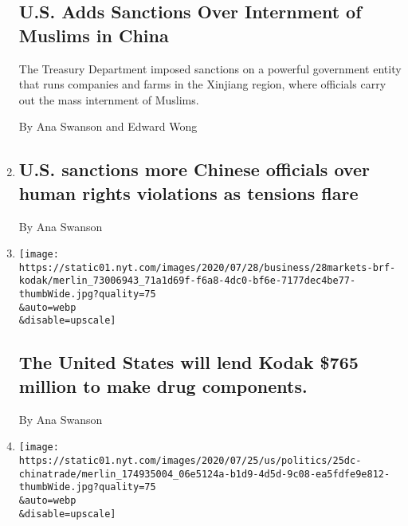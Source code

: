 \begin{enumerate}
{  \subsection{U.S. Adds Sanctions Over Internment of Muslims in
  China}\label{us-adds-sanctions-over-internment-of-muslims-in-china}}

  The Treasury Department imposed sanctions on a powerful government
  entity that runs companies and farms in the Xinjiang region, where
  officials carry out the mass internment of Muslims.

  By Ana Swanson and Edward Wong
\item
  \href{/live/2020/07/31/business/stock-market-today-coronavirus/us-sanctions-more-chinese-officials-over-human-rights-violations-as-tensions-flare}{}

  \hypertarget{us-sanctions-more-chinese-officials-over-human-rights-violations-as-tensions-flare}{%
  \subsection{U.S. sanctions more Chinese officials over human rights
  violations as tensions
  flare}\label{us-sanctions-more-chinese-officials-over-human-rights-violations-as-tensions-flare}}

  By Ana Swanson
\item
  \href{/live/2020/07/28/business/stock-market-today-coronavirus/the-united-states-will-lend-kodak-765-million-to-make-drug-components}{}

  \texttt{[image: https://static01.nyt.com/images/2020/07/28/business/28markets-brf-kodak/merlin\_73006943\_71a1d69f-f6a8-4dc0-bf6e-7177dec4be77-thumbWide.jpg?quality=75\\\&auto=webp\\\&disable=upscale]}

  \hypertarget{the-united-states-will-lend-kodak-765-million-to-make-drug-components}{%
  \subsection{The United States will lend Kodak \$765 million to make
  drug
  components.}\label{the-united-states-will-lend-kodak-765-million-to-make-drug-components}}

  By Ana Swanson
\item
  \href{/2020/07/25/business/economy/us-china-trade-diplomacy.html}{}

  \texttt{[image: https://static01.nyt.com/images/2020/07/25/us/politics/25dc-chinatrade/merlin\_174935004\_06e5124a-b1d9-4d5d-9c08-ea5fdfe9e812-thumbWide.jpg?quality=75\\\&auto=webp\\\&disable=upscale]}


\end{enumerate}
